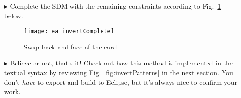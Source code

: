 \begin{itemize}
\item[$\blacktriangleright$] Complete the SDM with the remaining constraints according to Fig.~\ref{fig:sdm_invertComplete} below.

\vspace{0.5cm}

\begin{figure}[htbp]
\begin{center}
  \texttt{[image: ea\_invertComplete]}
  \caption{Swap back and face of the card}  
  \label{fig:sdm_invertComplete}
\end{center}
\end{figure}

\vspace{0.5cm}

\item[$\blacktriangleright$] Believe or not, that's it! Check out how this method is implemented in the textual syntax by reviewing
Fig.~\ref{fig:invertPatterns} in the next section. You don't \emph{have} to export and build to Eclipse, but it's always nice to confirm your work.


\end{itemize}

